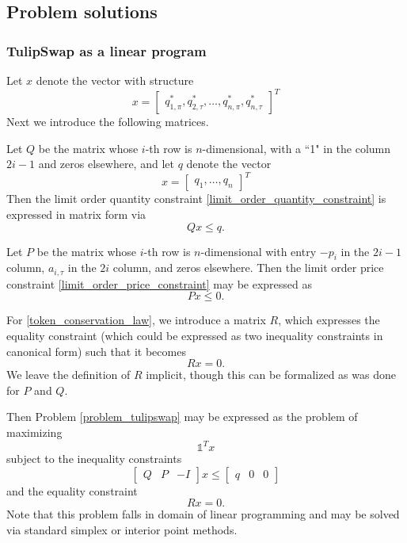 \documentclass[11pt, reqno]{amsart}
\theoremstyle{definition}
\theoremstyle{remark}
\begin{document}

\subsection{Problem solutions}

\subsubsection{TulipSwap as a linear program}

Let $x$ denote the vector with structure
\[
    x =
    \begin{bmatrix}
        q_{1, \pi}^*, q_{2, \tau}^*, \ldots, q_{n, \pi}^*, q_{n, \tau}^*
    \end{bmatrix}^T
\]
Next we introduce the following matrices.

Let $Q$ be the matrix whose $i$-th row is $n$-dimensional, with a ``1" in the
column $2i - 1$ and zeros elsewhere, and let $q$ denote the vector
\[
    x =
    \begin{bmatrix}
        q_1, \ldots, q_n
    \end{bmatrix}^T
\]
Then the limit order quantity constraint
\eqref{limit_order_quantity_constraint}
is expressed in matrix form via
\[
    Q x \leq q.
\]

Let $P$ be the matrix whose $i$-th row is $n$-dimensional with entry
$-p_i$ in the $2i - 1$ column, $a_{i, \tau}$ in the $2i$ column, and zeros
elsewhere. Then the limit order price constraint
\eqref{limit_order_price_constraint}
may be expressed as
\[
    P x \leq 0.
\]

For \eqref{token_conservation_law}, we introduce a matrix $R$, which expresses
the equality constraint (which could be expressed as two inequality constraints
in canonical form) such that it becomes
\[
    R x = 0.
\]
We leave the definition of $R$ implicit, though this can be formalized as was
done for $P$ and $Q$.

Then Problem \ref{problem_tulipswap} may be expressed as the problem of maximizing
\[
    \mathbb{1}^T x
\]
subject to the inequality constraints
\[
    \begin{bmatrix} Q & P & -I \end{bmatrix} x \leq
    \begin{bmatrix} q & 0 & 0 \end{bmatrix}
\]
and the equality constraint
\[
    R x = 0.
\]
Note that this problem falls in domain of linear programming and may be solved
via standard simplex or interior point methods.
\end{document}
